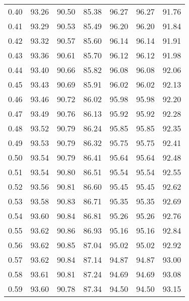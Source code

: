 \begin{tabular}{|c|c|c|c|c|c|c|}
      0.40 &     93.26 &     90.50 &      85.38 &   96.27 &      96.27 &         91.76 \\
      0.41 &     93.29 &     90.53 &      85.49 &   96.20 &      96.20 &         91.84 \\
      0.42 &     93.32 &     90.57 &      85.60 &   96.14 &      96.14 &         91.91 \\
      0.43 &     93.36 &     90.61 &      85.70 &   96.12 &      96.12 &         91.98 \\
      0.44 &     93.40 &     90.66 &      85.82 &   96.08 &      96.08 &         92.06 \\
      0.45 &     93.43 &     90.69 &      85.91 &   96.02 &      96.02 &         92.13 \\
      0.46 &     93.46 &     90.72 &      86.02 &   95.98 &      95.98 &         92.20 \\
      0.47 &     93.49 &     90.76 &      86.13 &   95.92 &      95.92 &         92.28 \\
      0.48 &     93.52 &     90.79 &      86.24 &   95.85 &      95.85 &         92.35 \\
      0.49 &     93.53 &     90.79 &      86.32 &   95.75 &      95.75 &         92.41 \\
      0.50 &     93.54 &     90.79 &      86.41 &   95.64 &      95.64 &         92.48 \\
      0.51 &     93.54 &     90.80 &      86.51 &   95.54 &      95.54 &         92.55 \\
      0.52 &     93.56 &     90.81 &      86.60 &   95.45 &      95.45 &         92.62 \\
      0.53 &     93.58 &     90.83 &      86.71 &   95.35 &      95.35 &         92.69 \\
      0.54 &     93.60 &     90.84 &      86.81 &   95.26 &      95.26 &         92.76 \\
      0.55 &     93.62 &     90.86 &      86.93 &   95.16 &      95.16 &         92.84 \\
      0.56 &     93.62 &     90.85 &      87.04 &   95.02 &      95.02 &         92.92 \\
      0.57 &     93.62 &     90.84 &      87.14 &   94.87 &      94.87 &         93.00 \\
      0.58 &     93.61 &     90.81 &      87.24 &   94.69 &      94.69 &         93.08 \\
      0.59 &     93.60 &     90.78 &      87.34 &   94.50 &      94.50 &         93.15 \\

\end{tabular}
